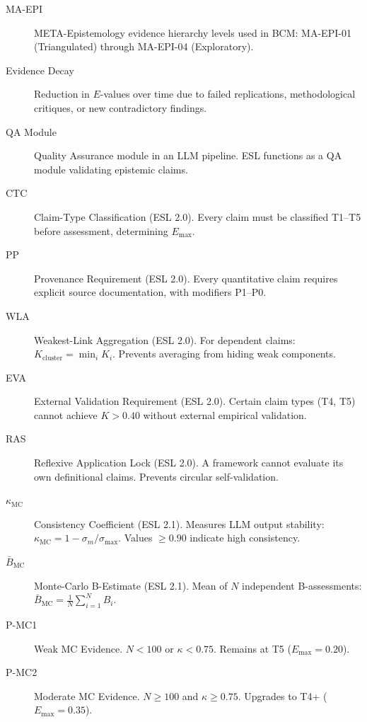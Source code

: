 \documentclass[11pt,a4paper]{article}
\begin{document}
\begin{description}
    \item[MA-EPI] META-Epistemology evidence hierarchy levels used in BCM: MA-EPI-01 (Triangulated) through MA-EPI-04 (Exploratory).

    \item[Evidence Decay] Reduction in $E$-values over time due to failed replications, methodological critiques, or new contradictory findings.

    \item[QA Module] Quality Assurance module in an LLM pipeline. ESL functions as a QA module validating epistemic claims.

    \item[CTC] Claim-Type Classification (ESL 2.0). Every claim must be classified T1--T5 before assessment, determining $E_{\max}$.

    \item[PP] Provenance Requirement (ESL 2.0). Every quantitative claim requires explicit source documentation, with modifiers P1--P0.

    \item[WLA] Weakest-Link Aggregation (ESL 2.0). For dependent claims: $K_{\text{cluster}} = \min_i K_i$. Prevents averaging from hiding weak components.

    \item[EVA] External Validation Requirement (ESL 2.0). Certain claim types (T4, T5) cannot achieve $K > 0.40$ without external empirical validation.

    \item[RAS] Reflexive Application Lock (ESL 2.0). A framework cannot evaluate its own definitional claims. Prevents circular self-validation.

    \item[$\kappa_{\text{MC}}$] Consistency Coefficient (ESL 2.1). Measures LLM output stability: $\kappa_{\text{MC}} = 1 - \sigma_m / \sigma_{\max}$. Values $\geq 0.90$ indicate high consistency.

    \item[$\bar{B}_{\text{MC}}$] Monte-Carlo B-Estimate (ESL 2.1). Mean of $N$ independent B-assessments: $\bar{B}_{\text{MC}} = \frac{1}{N}\sum_{i=1}^{N} B_i$.

    \item[P-MC1] Weak MC Evidence. $N < 100$ or $\kappa < 0.75$. Remains at T5 ($E_{\max} = 0.20$).

    \item[P-MC2] Moderate MC Evidence. $N \geq 100$ and $\kappa \geq 0.75$. Upgrades to T4+ ($E_{\max} = 0.35$).


\end{description}
\end{document}
